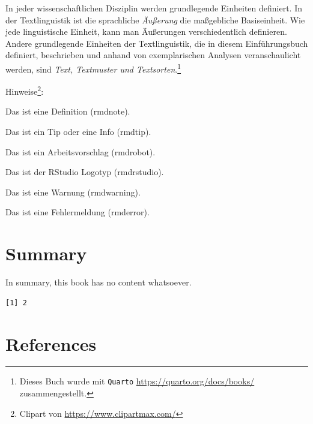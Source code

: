 \documentclass[
  letterpaper,
]{scrbook}
\newlength{\cslhangindent}
\newlength{\cslentryspacingunit} %
\newenvironment{CSLReferences}[2] %
 {%
  \setlength{\parindent}{0pt}
  \ifodd #1
  \let\oldpar\par
  \def\par{\hangindent=\cslhangindent\oldpar}
  \fi
  \setlength{\parskip}{#2\cslentryspacingunit}
 }%
 {}
\begin{document}
In jeder wissenschaftlichen Disziplin werden grundlegende Einheiten
definiert. In der Textlinguistik ist die sprachliche \emph{Äußerung} die
maßgebliche Basiseinheit. Wie jede linguistische Einheit, kann man
Äußerungen verschiedentlich definieren. Andere grundlegende Einheiten
der Textlinguistik, die in diesem Einführungsbuch definiert, beschrieben
und anhand von exemplarischen Analysen veranschaulicht werden, sind
\emph{Text, Textmuster und Textsorten}.\footnote{Dieses Buch wurde mit
  \texttt{Quarto} \url{https://quarto.org/docs/books/} zusammengestellt.}

Hinweise\footnote{Clipart von \url{https://www.clipartmax.com/}}:

Das ist eine Definition (rmdnote).

Das ist ein Tip oder eine Info (rmdtip).

Das ist ein Arbeitsvorschlag (rmdrobot).

Das ist der RStudio Logotyp (rmdrstudio).

Das ist eine Warnung (rmdwarning).

Das ist eine Fehlermeldung (rmderror).


\hypertarget{summary}{%
\chapter{Summary}\label{summary}}

In summary, this book has no content whatsoever.

\begin{verbatim}
[1] 2
\end{verbatim}


\hypertarget{references}{%
\chapter*{References}\label{references}}

\hypertarget{refs}{}
\begin{CSLReferences}{0}{0}
\end{CSLReferences}


\backmatter

\printindex
\end{document}

